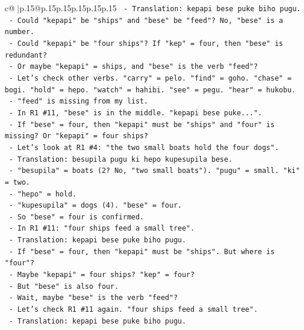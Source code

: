 \documentclass{article}
\begin{document}
{\begin{supertabular}{c@{$\;$}|p{.15\linewidth}@{}p{.15\linewidth}p{.15\linewidth}p{.15\linewidth}p{.15\linewidth}p{.15\linewidth}}
{{{\texttt{      {-} Translation: kepapi bese puke biho pugu.} \\
\texttt{      {-} Could "kepapi" be "ships" and "bese" be "feed"? No, "bese" is a number.} \\
\texttt{      {-} Could "kepapi" be "four ships"? If "kep" = four, then "bese" is redundant?} \\
\texttt{      {-} Or maybe "kepapi" = ships, and "bese" is the verb "feed"?} \\
\texttt{      {-} Let's check other verbs. "carry" = pelo. "find" = goho. "chase" = bogi. "hold" = hepo. "watch" = hahibi. "see" = pegu. "hear" = hukobu.} \\
\texttt{      {-} "feed" is missing from my list.} \\
\texttt{      {-} In R1 \#11, "bese" is in the middle. "kepapi bese puke...".} \\
\texttt{      {-} If "bese" = four, then "kepapi" must be "ships" and "four" is missing? Or "kepapi" = four ships?} \\
\texttt{      {-} Let's look at R1 \#4: "the two small boats hold the four dogs".} \\
\texttt{        {-} Translation: besupila pugu ki hepo kupesupila bese.} \\
\texttt{        {-} "besupila" = boats (2? No, "two small boats"). "pugu" = small. "ki" = two.} \\
\texttt{        {-} "hepo" = hold.} \\
\texttt{        {-} "kupesupila" = dogs (4). "bese" = four.} \\
\texttt{        {-} So "bese" = four is confirmed.} \\
\texttt{        {-} In R1 \#11: "four ships feed a small tree".} \\
\texttt{        {-} Translation: kepapi bese puke biho pugu.} \\
\texttt{        {-} If "bese" = four, then "kepapi" must be "ships". But where is "four"?} \\
\texttt{        {-} Maybe "kepapi" = four ships? "kep" = four?} \\
\texttt{        {-} But "bese" is also four.} \\
\texttt{        {-} Wait, maybe "bese" is the verb "feed"?} \\
\texttt{        {-} Let's check R1 \#11 again. "four ships feed a small tree".} \\
\texttt{        {-} Translation: kepapi bese puke biho pugu.} \\
}}}
\end{supertabular}}
\end{document}
